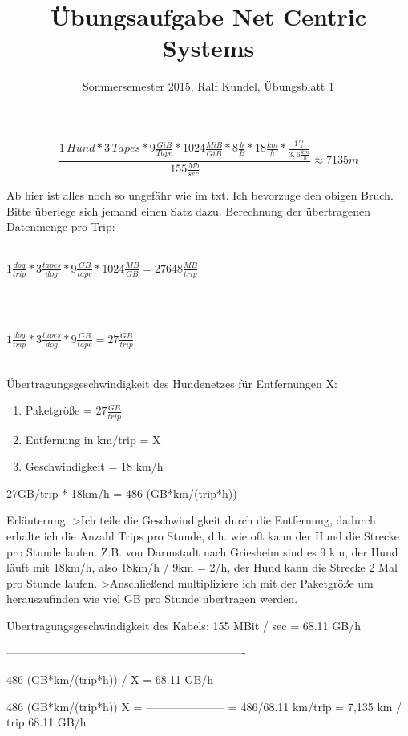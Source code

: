 \documentclass[a4paper,
			llpt,
			solution,
			accentcolor=tud2d,
			colorbacktitle
			]
			{tudexercise}
\title{Übungsaufgabe Net Centric Systems}
\subtitle{Sommersemester 2015, Ralf Kundel, Übungsblatt 1}
\begin{document}
\maketitle

\section{}
$$
\frac{1\,Hund * 3\,Tapes * 9 \frac{GiB}{Tape} * 1024\frac{MiB}{GiB} * 8 \frac{b}{B} * 18 \frac{km}{h} * \frac{1\frac{m}{s}}{3,6\frac{km}{h}}}{155 \frac{Mb}{sec}}
\approx
7135 m
$$

Ab hier ist alles noch so ungefähr wie im txt. Ich bevorzuge den obigen Bruch. Bitte überlege sich jemand einen Satz dazu.
Berechnung der übertragenen Datenmenge pro Trip:
\\\\
\centerline{$   1 \frac{dog}{trip} * 3 \frac{tapes}{dog} * 9 \frac{GB}{tape} * 1024 \frac{MB}{GB} = 27648 \frac{MB}{trip}
$}
\\\\
\centerline{
$
    1 \frac{dog}{trip} * 3 \frac{tapes}{dog} * 9 \frac{GB}{tape} = 27 \frac{GB}{trip}
$
}
\\
Übertragungsgeschwindigkeit des Hundenetzes für Entfernungen X:
\\
\begin{enumerate}


\item    Paketgröße = $27 \frac{GB}{trip}$
\item    Entfernung in km/trip = X 
\item    Geschwindigkeit = 18 km/h
\end{enumerate}
    27GB/trip * 18km/h = 486 (GB*km/(trip*h))
    
Erläuterung:
>Ich teile die Geschwindigkeit durch die Entfernung, dadurch erhalte ich die Anzahl Trips pro Stunde, d.h. wie oft kann der Hund die Strecke pro Stunde laufen. Z.B. von Darmstadt nach Griesheim sind es 9 km, der Hund läuft mit 18km/h, also 18km/h / 9km = 2/h, der Hund kann die Strecke 2 Mal pro Stunde laufen.
>Anschließend multipliziere ich mit der Paketgröße um herauszufinden wie viel GB pro Stunde übertragen werden.


Übertragungsgeschwindigkeit des Kabels:
    155 MBit / sec = 68.11 GB/h

----------------------------------------------------------------

    486 (GB*km/(trip*h)) / X = 68.11 GB/h 


         486 (GB*km/(trip*h))
    X = ---------------------   =  486/68.11  km/trip = 7,135 km / trip
              68.11 GB/h 
              
\end{document}

